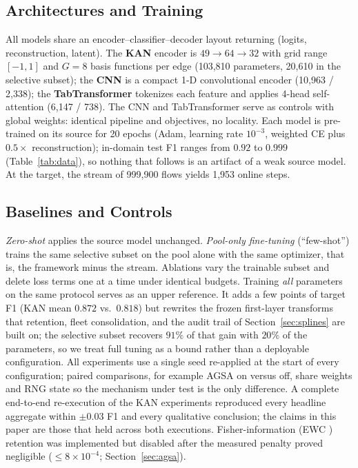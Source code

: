 \documentclass[10pt, conference, letterpaper]{IEEEtran}
\begin{document}
\subsection{Architectures and Training}
All models share an encoder--classifier--decoder layout returning
(logits, reconstruction, latent). The \textbf{KAN}
\cite{liu2024kan,efficientkan} encoder is $49{\to}64{\to}32$ with grid
range $[-1,1]$ and $G=8$ basis functions per edge (103{,}810
parameters, 20{,}610 in the selective subset);
the \textbf{CNN} is a compact 1-D convolutional encoder (10{,}963 /
2{,}338); the \textbf{TabTransformer} \cite{huang2020tabtransformer}
tokenizes each feature and applies 4-head self-attention (6{,}147 /
738). The CNN and TabTransformer serve as controls with global weights:
identical pipeline and objectives, no locality. Each model is
pre-trained on its source for 20 epochs (Adam, learning rate $10^{-3}$,
weighted CE plus $0.5\times$ reconstruction); in-domain test F1 ranges
from $0.92$ to $0.999$ (Table~\ref{tab:data}), so nothing that follows
is an artifact of a weak source model. At the target, the stream of
999{,}900 flows yields 1{,}953 online steps.

\subsection{Baselines and Controls}
\emph{Zero-shot} applies the source model unchanged. \emph{Pool-only
fine-tuning} (``few-shot'') trains the same selective subset on the
pool alone with the same optimizer, that is, the framework minus the
stream. Ablations vary the trainable subset and delete loss terms one
at a time under identical budgets. Training \emph{all} parameters on
the same protocol serves as an upper reference. It adds a few points
of target F1 (KAN mean $0.872$ vs.\ $0.818$) but rewrites the frozen
first-layer transforms that retention, fleet consolidation, and the
audit trail of Section~\ref{sec:splines} are built on; the selective
subset recovers $91\%$ of that gain with $20\%$ of the parameters, so
we treat full tuning as a bound rather than a deployable
configuration. All experiments
use a single seed re-applied at the start of every configuration;
paired comparisons, for example AGSA on versus off, share weights and
RNG state so the mechanism under test is the only difference. A complete end-to-end
re-execution of the KAN experiments reproduced every headline aggregate
within $\pm 0.03$ F1 and every qualitative conclusion; the claims in
this paper are those that held across both executions. Fisher-information (EWC
\cite{kirkpatrick2017ewc}) retention was implemented but disabled after
the measured penalty proved negligible ($\leq 8\times10^{-4}$;
Section~\ref{sec:agsa}).
\end{document}
